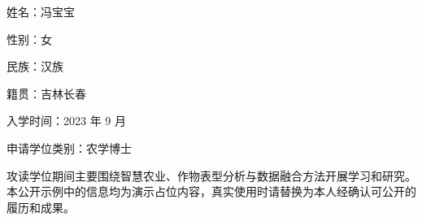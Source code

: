 姓名：冯宝宝

性别：女

民族：汉族

籍贯：吉林长春

入学时间：2023 年 9 月

申请学位类别：农学博士

攻读学位期间主要围绕智慧农业、作物表型分析与数据融合方法开展学习和研究。本公开示例中的信息均为演示占位内容，真实使用时请替换为本人经确认可公开的履历和成果。
